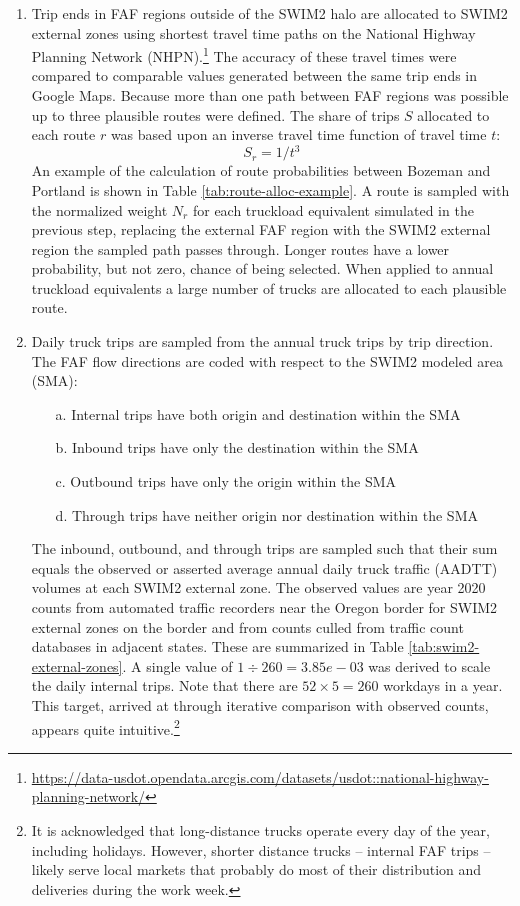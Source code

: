 \begin{enumerate}
    \item Trip ends in FAF regions outside of the SWIM2 halo are allocated to SWIM2 external zones using shortest travel time paths on the National Highway Planning Network (NHPN).\footnote{\url{https://data-usdot.opendata.arcgis.com/datasets/usdot::national-highway-planning-network/}} The accuracy of these travel times were compared to comparable values generated between the same trip ends in Google Maps. Because more than one path between FAF regions was possible up to three plausible routes were defined. The share of trips $S$ allocated to each route $r$ was based upon an inverse travel time function of travel time $t$:
    \begin{equation}
    S_r = 1 / {t^3}
    \end{equation}
    An example of the calculation of route probabilities between Bozeman and Portland is shown in Table \ref{tab:route-alloc-example}. A route is sampled with the normalized weight $N_r$ for each truckload equivalent simulated in the previous step, replacing the external FAF region with the SWIM2 external region the sampled path passes through. Longer routes have a lower probability, but not zero, chance of being selected. When applied to annual truckload equivalents a large number of trucks are allocated to each plausible route.
    \item Daily truck trips are sampled from the annual truck trips by trip direction. The FAF flow directions are coded with respect to the SWIM2 modeled area (SMA):
    \begin{enumerate}
        \item[a.] Internal trips have both origin and destination within the SMA
        \item[b.] Inbound trips have only the destination within the SMA
        \item[c.] Outbound trips have only the origin within the SMA
        \item[d.] Through trips have neither origin nor destination within the SMA
    \end{enumerate}
    The inbound, outbound, and through trips are sampled such that their sum equals the observed or asserted average annual daily truck traffic (AADTT) volumes at each SWIM2 external zone. The observed values are year 2020 counts from automated traffic recorders near the Oregon border for SWIM2 external zones on the border and from counts culled from traffic count databases in adjacent states. These are summarized in Table \ref{tab:swim2-external-zones}. A single value of $1 \div 260 = 3.85e-03$ was derived to scale the daily internal trips. Note that there are $52 \times 5 = 260$ workdays in a year. This target, arrived at through iterative comparison with observed counts, appears quite intuitive.\footnote{It is acknowledged that long-distance trucks operate every day of the year, including holidays. However, shorter distance trucks -- internal FAF trips -- likely serve local markets that probably do most of their distribution and deliveries during the work week.}

\end{enumerate}
